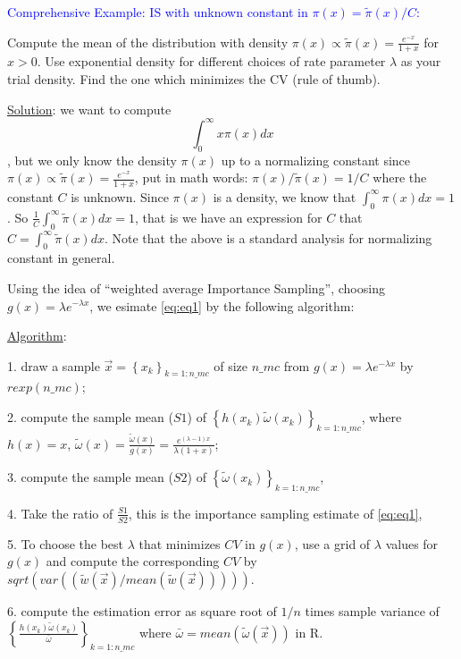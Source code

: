\documentclass[12pt]{article}
\newcommand{\set}[1]{\left\{#1\right\}}
\numberwithin{equation}{subsection}
\begin{document}
\noindent
\textcolor{blue}{Comprehensive Example: IS with unknown constant in $\pi(x) = \tilde{\pi}(x) / C$:}

Compute the mean of the distribution with density $\pi(x) \propto \tilde{\pi}(x) = \frac{e^{-x}}{1+ x}$ for $x >0$. Use exponential density for different choices of rate parameter $\lambda$ as your trial density. Find the one which minimizes the CV (rule of thumb).

\underline{Solution}: we want to compute 
\begin{equation}\label{eq:eq1}
\int_0^{\infty} x\pi(x)dx
\end{equation}, but we only know the density $\pi(x)$ up to a normalizing constant since $\pi(x) \propto \tilde{\pi}(x) = \frac{e^{-x}}{1+ x}$, put in math words: $\pi(x) / \tilde{\pi}(x) = 1/C$ where the constant $C$ is unknown. Since $\pi(x)$ is a density, we know that $\int_0^{\infty} \pi(x)dx = 1$. So $\frac{1}{C}\int_0^{\infty} \tilde{\pi}(x)dx = 1$, that is we have an expression for $C$ that $C = \int_0^{\infty} \tilde{\pi}(x)dx$. Note that the above is a standard analysis for normalizing constant in general.

Using the idea of ``weighted average Importance Sampling'', choosing $g(x) = \lambda e^{-\lambda x}$, we esimate \eqref{eq:eq1} by the following algorithm: \newline

\underline{Algorithm}:

1. draw a sample $\vec{x} = \set{x_k}_{k=1:n\_mc}$ of size $n\_mc$ from $g(x) = \lambda e^{-\lambda x}$ by $rexp(n\_mc)$;

2. compute the sample mean ($S1$) of $\set{h(x_k)\tilde{\omega}(x_k)}_{k=1 : n\_mc}$, where $h(x) = x$, $\tilde{\omega}(x) = \frac{\tilde{\omega}(x)}{g(x)} = \frac{e^{(\lambda - 1)x}}{\lambda(1+x)}$;

3. compute the sample mean ($S2$) of $\set{\tilde{\omega}(x_k)}_{k=1 : n\_mc}$, 

4. Take the ratio of $\frac{S1}{S2}$, this is the importance sampling estimate of \eqref{eq:eq1},

5. To choose the best $\lambda$ that minimizes $CV$ in $g(x)$, use a grid of $\lambda$ values for $g(x)$ and compute the corresponding $CV$ by $sqrt( var( (\tilde{w}(\vec{x})/mean(\tilde{w}(\vec{x})))))$.

6. compute the estimation error as square root of $1/n$ times sample variance of $\set{\frac{h(x_k)\tilde{\omega}(x_k)}{\bar{\omega}}}_{k=1 : n\_mc}$ where $\bar{\omega} = mean(\tilde{\omega}(\vec{x}))$ in R. \newline
\end{document}
